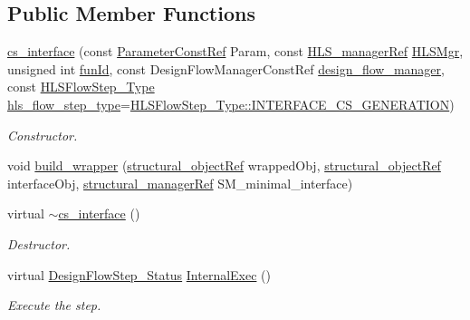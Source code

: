 \subsection*{Public Member Functions}
\begin{DoxyCompactItemize}
\item 
\hyperlink{classcs__interface_af38b59ad1f1825bbed19763af1fbec6c}{cs\+\_\+interface} (const \hyperlink{Parameter_8hpp_a37841774a6fcb479b597fdf8955eb4ea}{Parameter\+Const\+Ref} Param, const \hyperlink{hls__manager_8hpp_acd3842b8589fe52c08fc0b2fcc813bfe}{H\+L\+S\+\_\+manager\+Ref} \hyperlink{classHLS__step_ade85003a99d34134418451ddc46a18e9}{H\+L\+S\+Mgr}, unsigned int \hyperlink{classHLSFunctionStep_a3e6434fd86c698b0c70520b859bff5b0}{fun\+Id}, const Design\+Flow\+Manager\+Const\+Ref \hyperlink{classDesignFlowStep_ab770677ddf087613add30024e16a5554}{design\+\_\+flow\+\_\+manager}, const \hyperlink{hls__step_8hpp_ada16bc22905016180e26fc7e39537f8d}{H\+L\+S\+Flow\+Step\+\_\+\+Type} \hyperlink{classHLS__step_aefd59af15346ec3f10bf12bd756e6777}{hls\+\_\+flow\+\_\+step\+\_\+type}=\hyperlink{hls__step_8hpp_ada16bc22905016180e26fc7e39537f8dae84ca7940ca856e25643ed54e0dc0f9a}{H\+L\+S\+Flow\+Step\+\_\+\+Type\+::\+I\+N\+T\+E\+R\+F\+A\+C\+E\+\_\+\+C\+S\+\_\+\+G\+E\+N\+E\+R\+A\+T\+I\+ON})
\begin{DoxyCompactList}\small\item\em Constructor. \end{DoxyCompactList}\item 
void \hyperlink{classcs__interface_a21c5ab8db76d61e95448213b99388792}{build\+\_\+wrapper} (\hyperlink{structural__objects_8hpp_a8ea5f8cc50ab8f4c31e2751074ff60b2}{structural\+\_\+object\+Ref} wrapped\+Obj, \hyperlink{structural__objects_8hpp_a8ea5f8cc50ab8f4c31e2751074ff60b2}{structural\+\_\+object\+Ref} interface\+Obj, \hyperlink{structural__manager_8hpp_ab3136f0e785d8535f8d252a7b53db5b5}{structural\+\_\+manager\+Ref} S\+M\+\_\+minimal\+\_\+interface)
\item 
virtual \hyperlink{classcs__interface_a16aecb185035e2abca9409d01c829510}{$\sim$cs\+\_\+interface} ()
\begin{DoxyCompactList}\small\item\em Destructor. \end{DoxyCompactList}\item 
virtual \hyperlink{design__flow__step_8hpp_afb1f0d73069c26076b8d31dbc8ebecdf}{Design\+Flow\+Step\+\_\+\+Status} \hyperlink{classcs__interface_aee8a7879cdc7e9591c5c7bce22c3d1a7}{Internal\+Exec} ()
\begin{DoxyCompactList}\small\item\em Execute the step. \end{DoxyCompactList}\end{DoxyCompactItemize}
